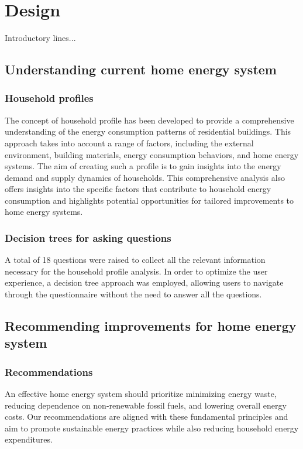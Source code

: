 \chapter{Design} 

Introductory lines...

\section{Understanding current home energy system}


\subsection{Household profiles}

The concept of household profile has been developed to provide a comprehensive understanding of the energy consumption patterns of residential buildings. 
This approach takes into account a range of factors, including the external environment, building materials, energy consumption behaviors, and home energy systems. 
The aim of creating such a profile is to gain insights into the energy demand and supply dynamics of households. 
This comprehensive analysis also offers insights into the specific factors that contribute to household energy consumption and highlights potential opportunities for tailored improvements to home energy systems. 


\subsection{Decision trees for asking questions}

A total of 18 questions were raised to collect all the relevant information necessary for the household profile analysis. 
In order to optimize the user experience, a decision tree approach was employed, allowing users to navigate through the questionnaire without the need to answer all the questions. 


\section{Recommending improvements for home energy system}

\subsection{Recommendations}

An effective home energy system should prioritize minimizing energy waste, reducing dependence on non-renewable fossil fuels, and lowering overall energy costs. Our recommendations are aligned with these fundamental principles and aim to promote sustainable energy practices while also reducing household energy expenditures. 

